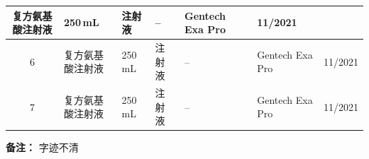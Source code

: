 \documentclass[UTF8,10pt,a4paper,fontset=fandol]{ctexart}
\newcommand{\fieldvalue}[1]{#1}
\newcommand{\handwritten}[1]{#1}
\begin{document}
\begin{tabularx}{\textwidth}{|c|X|X|X|X|X|c|}
\fieldvalue{复方氨基酸注射液} &
\fieldvalue{250\,mL} &
\fieldvalue{注射液} &
\fieldvalue{--} &
\fieldvalue{Gentech Exa Pro} &
\fieldvalue{11/2021} \\
\hline
6 &
\fieldvalue{复方氨基酸注射液} &
\fieldvalue{250\,mL} &
\fieldvalue{注射液} &
\fieldvalue{--} &
\fieldvalue{Gentech Exa Pro} &
\fieldvalue{11/2021} \\
\hline
7 &
\fieldvalue{复方氨基酸注射液} &
\fieldvalue{250\,mL} &
\fieldvalue{注射液} &
\fieldvalue{--} &
\fieldvalue{Gentech Exa Pro} &
\fieldvalue{11/2021} \\
\hline
\end{tabularx}

\vspace{1em}

\noindent
\textbf{备注：}
\fieldvalue{\handwritten{字迹不清}}
\end{document}
